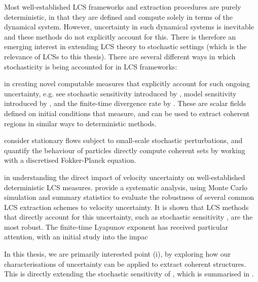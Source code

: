 Most well-established LCS frameworks and extraction procedures are purely deterministic, in that they are defined and compute solely in terms of the dynamical system.
However, uncertainty in such dynamical systems is inevitable and these methods do not explicitly account for this.
There is therefore an emerging interest \citep{Balasuriya_2020_StochasticApproachesLagrangian} in extending LCS theory to stochastic settings (which is the relevance of LCSs to this thesis).
There are several different ways in which stochasticity is being accounted for in LCS frameworks:
\begin{romanate}
	\item in creating novel computable measures that explicitly account for such ongoing uncertainty, e.g. see stochastic sensitivity introduced by \citet{Balasuriya_2020_StochasticSensitivityComputable}, model sensitivity introduced by \citet{KaszasHaller_2020_UniversalUpperEstimate}, and the finite-time divergence rate by \citet{BranickiUda_2023_PathBasedDivergenceRates}.
	These are scalar fields defined on initial conditions that measure, and can be used to extract coherent regions in similar ways to deterministic methods.

	\item \citet{BalasuriyaGottwald_2018_EstimatingStableUnstable} consider stationary flows subject to small-scale stochastic perturbations, and quantify the behaviour of particles
	\citet{DennerEtAl_2016_ComputingCoherentSets} directly compute coherent sets by working with a discretised Fokker-Planck equation.

	\item in understanding the direct impact of velocity uncertainty on well-established deterministic LCS measures.
	\citet{BadzaEtAl_2023_HowSensitiveAre} provide a systematic analysis, using Monte Carlo simulation and summary statistics to evaluate the robustness of several common LCS extraction schemes to velocity uncertainty.
	It is shown that LCS methods that directly account for this uncertainty, such as stochastic sensitivity \citep{Balasuriya_2020_StochasticSensitivityComputable}, are the most robust.
	The finite-time Lyapunov exponent has received particular attention, with an initial study into the impac


\end{romanate}
In this thesis, we are primarily interested point (i), by exploring how our characterisations of uncertainty can be applied to extract coherent structures.
This is directly extending the stochastic sensitivity of \citet{Balasuriya_2020_StochasticSensitivityComputable}, which is summarised in .



